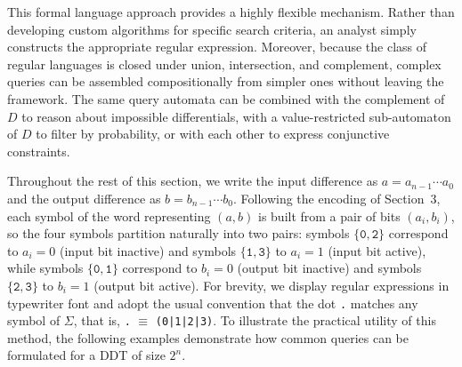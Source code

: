 This formal language approach provides a highly flexible mechanism. Rather
than developing custom algorithms for specific search criteria, an analyst
simply constructs the appropriate regular expression. Moreover, because
the class of regular languages is closed under union, intersection, and
complement, complex queries can be assembled compositionally from simpler
ones without leaving the framework. The same query automata can be combined
with the complement of $D$ to reason about impossible differentials, with a
value-restricted sub-automaton of $D$ to filter by probability, or with each
other to express conjunctive constraints.

Throughout the rest of this section, we write the input difference as
$a = a_{n-1}\cdots a_0$ and the output difference as $b = b_{n-1}\cdots
b_0$. Following the encoding of Section~3, each symbol of the word
representing $(a,b)$ is built from a pair of bits $(a_i, b_i)$, so the
four symbols partition naturally into two pairs: symbols
$\{\texttt{0},\texttt{2}\}$ correspond to $a_i = 0$ (input bit
inactive) and symbols $\{\texttt{1},\texttt{3}\}$ to $a_i = 1$ (input
bit active), while symbols $\{\texttt{0},\texttt{1}\}$ correspond to
$b_i = 0$ (output bit inactive) and symbols $\{\texttt{2},\texttt{3}\}$
to $b_i = 1$ (output bit active). For brevity, we display regular
expressions in typewriter font and adopt the usual convention that the
dot \texttt{.} matches any symbol of $\Sigma$, that is, \texttt{.}
$\equiv$ \texttt{(0|1|2|3)}. To illustrate the practical utility of
this method, the following examples demonstrate how common queries can
be formulated for a DDT of size $2^n$.

